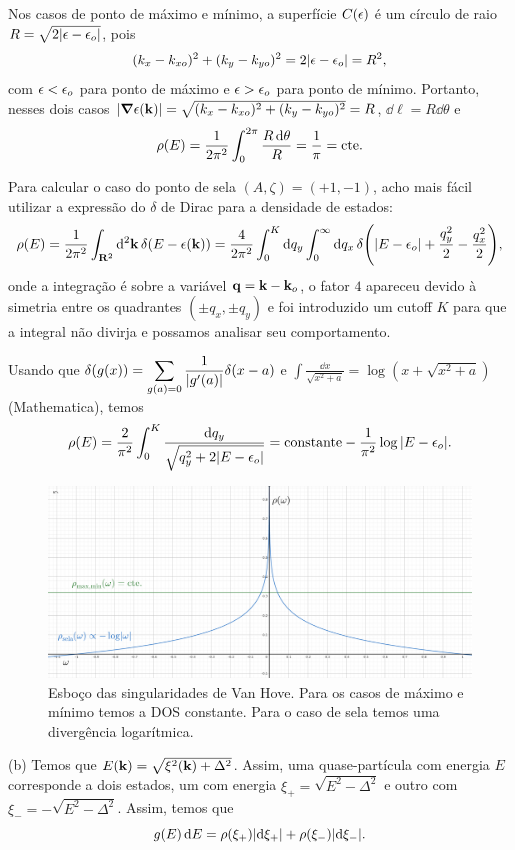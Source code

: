 \documentclass[a4paper,10pt]{article}
\begin{document}
Nos casos de ponto de máximo e mínimo, a superfície $C(\epsilon)$ é um círculo de raio $R = \sqrt{2\abs{\epsilon-\epsilon_o}}$, pois
$$
(k_x - k_{xo})^2 + (k_y - k_{yo})^2 = 2 \abs{\epsilon - \epsilon_o} = R^2,
$$
com $\epsilon < \epsilon_o$ para ponto de máximo e $\epsilon > \epsilon_o$ para ponto de mínimo. Portanto, nesses dois casos $\abs{\grad{\epsilon(\vb{k})}} = \sqrt{(k_x - k_{xo})^2 + (k_y - k_{yo})^2} = R$, $\dd{\ell} = R \dd{\theta}$ e
$$
\rho(E) = \frac{1}{2\pi^2} \int_0^{2\pi} \frac{R \dd{\theta}}{R} = \frac{1}{\pi} = \text{cte}.
$$

Para calcular o caso do ponto de sela $(A, \zeta) = (+1, -1)$, acho mais fácil utilizar a expressão do $\delta$ de Dirac para a densidade de estados:
$$
\rho(E) = \frac{1}{2\pi^2} \int_{\vb{R}^2} \dd[2]{\vb{k}} \delta(E - \epsilon(\vb{k})) =
\frac{4}{2 \pi^2} \int_0^K \dd{q_y} \int_0^\infty \dd{q_x}
\delta\qty(\abs{E - \epsilon_o} + \frac{q_y^2}{2} - \frac{q_x^2}{2}),
$$
onde a integração é sobre a variável $\vb{q} = \vb{k} - \vb{k}_o$, o fator $4$ apareceu devido à simetria entre os quadrantes $(\pm q_x, \pm q_y)$ e foi introduzido um cutoff $K$ para que a integral não divirja e possamos analisar seu comportamento.

Usando que $\displaystyle{\delta(g(x)) = \sum_{g(a)=0} \frac{1}{\abs{g'(a)}} \delta(x-a)}$ e $\displaystyle{\int \frac{\dd{x}}{\sqrt{x^2+a}} = \log(x + \sqrt{x^2 + a})}$ (Mathematica), temos
$$
\rho(E) = \frac{2}{\pi^2} \int_0^K \frac{\dd{q_y}}{\sqrt{q_y^2 + 2 \abs{E-\epsilon_o}}} =
\text{constante} - \frac{1}{\pi^2} \log\abs{E-\epsilon_o}.
$$

\begin{figure}[H]
\centering
\includegraphics[width=0.7\linewidth]{fig/vanhove.png}
\caption{Esboço das singularidades de Van Hove. Para os casos de máximo e mínimo temos a DOS constante. Para o caso de sela temos uma divergência logarítmica.}
\label{fig:vanhove}
\end{figure}

\n

(b) Temos que $E(\vb{k}) = \sqrt{\xi^2(\vb{k}) + \Delta^2}$. Assim, uma quase-partícula com energia $E$ corresponde a dois estados, um com energia $\xi_+ = \sqrt{E^2 - \Delta^2}$ e outro com $\xi_- = -\sqrt{E^2 - \Delta^2}$. Assim, temos que
$$
g(E) \dd{E} = \rho(\xi_+) \abs{\dd{\xi_+}} + \rho(\xi_-) \abs{\dd{\xi_-}}.
$$
\end{document}
